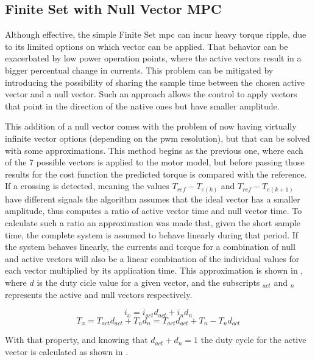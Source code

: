 \subsection{Finite Set with Null Vector MPC}

Although effective, the simple Finite Set \gls{mpc} can incur heavy torque ripple, due to its limited options on which vector can be applied. That behavior can be exacerbated by low power operation points, where the active vectors result in a bigger percentual change in currents. This problem can be mitigated by introducing the possibility of sharing the sample time between the chosen active vector and a null vector. Such an approach allows the control to apply vectors that point in the direction of the native ones but have smaller amplitude.

This addition of a null vector comes with the problem of now having virtually infinite vector options (depending on the \gls{pwm} resolution), but that can be solved with some approximations. This method begins as the previous one, where each of the 7 possible vectors is applied to the motor model, but before passing those results for the cost function the predicted torque is compared with the reference. If a crossing is detected, meaning the values $T_{ref} - T_{e(k)}$ and $T_{ref} - T_{e(k+1)}$ have different signals the algorithm assumes that the ideal vector has a smaller amplitude, thus computes a ratio of active vector time and null vector time. To calculate such a ratio an approximation was made that, given the short sample time, the complete system is assumed to behave linearly during that period. If the system behaves linearly, the currents and torque for a combination of null and active vectors will also be a linear combination of the individual values for each vector multiplied by its application time. This approximation is shown in , where $d$ is the duty cicle value for a given vector, and the subscripts $_{act}$ and $_n$ represents the active and null vectors respectively.

\begin{equation}
	i_x = i_{act} d_{act} + i_n d_n
	\label{eq:linear_combination}
\end{equation}
\begin{equation}
	T_x = T_{act} d_{act} + T_n d_n = T_{act} d_{act} + T_n - T_n d_{act}
	\label{eq:linear_combination_torque}
\end{equation}

With that property, and knowing that $d_{act} + d_n = 1$ the duty cycle for the active vector is calculated as shown in .

